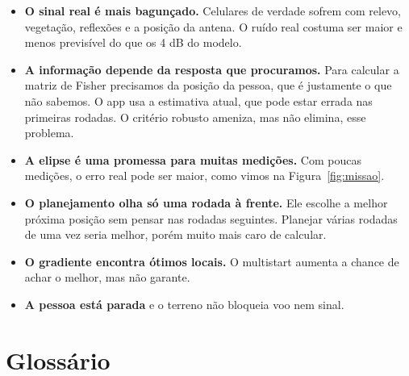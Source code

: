 \documentclass[11pt,a4paper]{article}
\begin{document}
\begin{itemize}
  \item \textbf{O sinal real é mais bagunçado.} Celulares de verdade sofrem com relevo, vegetação, reflexões e a posição da antena. O ruído real costuma ser maior e menos previsível do que os 4 dB do modelo.
  \item \textbf{A informação depende da resposta que procuramos.} Para calcular a matriz de Fisher precisamos da posição da pessoa, que é justamente o que não sabemos. O app usa a estimativa atual, que pode estar errada nas primeiras rodadas. O critério robusto ameniza, mas não elimina, esse problema.
  \item \textbf{A elipse é uma promessa para muitas medições.} Com poucas medições, o erro real pode ser maior, como vimos na Figura~\ref{fig:missao}.
  \item \textbf{O planejamento olha só uma rodada à frente.} Ele escolhe a melhor próxima posição sem pensar nas rodadas seguintes. Planejar várias rodadas de uma vez seria melhor, porém muito mais caro de calcular.
  \item \textbf{O gradiente encontra ótimos locais.} O multistart aumenta a chance de achar o melhor, mas não garante.
  \item \textbf{A pessoa está parada} e o terreno não bloqueia voo nem sinal.
\end{itemize}

\section{Glossário}
\end{document}
